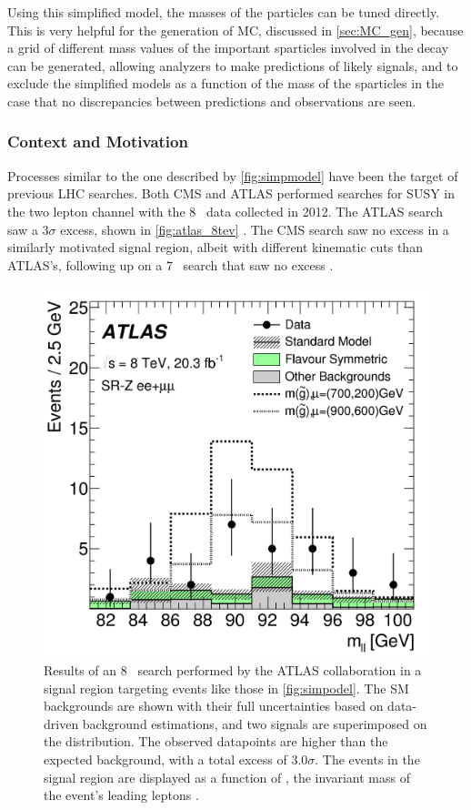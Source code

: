 Using this simplified model, the masses of the particles can be tuned directly. This is very helpful for the generation of \ac{MC}, discussed in \autoref{sec:MC_gen}, because a grid of different mass values of the important sparticles involved in the decay can be generated, allowing analyzers to make predictions of likely signals, and to exclude the simplified models as a function of the mass of the sparticles in the case that no discrepancies between predictions and observations are seen. 

\subsubsection{Context and Motivation}

Processes similar to the one described by \autoref{fig:simpmodel} have been the target of previous \ac{LHC} searches. Both \ac{CMS} and ATLAS performed searches for \ac{SUSY} in the two lepton channel with the 8 \tev~data collected in 2012. The ATLAS search saw a 3$\sigma$ excess, shown in \autoref{fig:atlas_8tev} \cite{SUSY-2014-10}. The \ac{CMS} search saw no excess in a similarly motivated signal region, albeit with different kinematic cuts than ATLAS's, following up on a 7 \tev~search that saw no excess \cite{Chatrchyan:2012qka, CMS2}. 

\begin{centering}
\begin{figure}[!hbt]
\myfloatalign
\includegraphics[width=.9\linewidth]{figures/theory/figaux_12a.png}
\caption{ Results of an 8 \tev~search performed by the ATLAS collaboration in a signal region targeting events like those in \autoref{fig:simpodel}. The \ac{SM} backgrounds are shown with their full uncertainties based on data-driven background estimations, and two signals are superimposed on the distribution. The observed datapoints are higher than the expected background, with a total excess of 3.0$\sigma$. The events in the signal region are displayed as a function of \mll, the invariant mass of the event's leading leptons \cite{SUSY-2014-10}.}
\label{fig:atlas_8tev}
\end{figure}
\end{centering}

